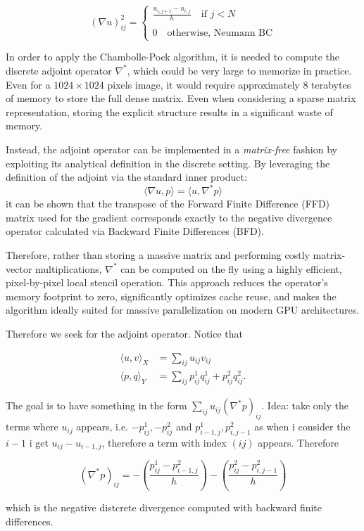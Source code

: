 \begin{example}
    \[ (\nabla u)_{ij}^2 = \begin{cases}
        \displaystyle\frac{u_{i,j+1} - u_{i,j}}{h} \quad \text{if } j < N \\
        \\ 
        0 \quad\text{otherwise, Neumann BC}
    \end{cases}
    \]

    In order to apply the Chambolle-Pock algorithm, it is needed to compute the discrete adjoint operator $\nabla^*$, which could be very large to memorize in practice. Even for a $1024 \times 1024$ pixels image, it would require approximately 8 terabytes of memory to store the full dense matrix. Even when considering a sparse matrix representation, storing the explicit structure results in a significant waste of memory. 

    Instead, the adjoint operator can be implemented in a \textit{matrix-free} fashion by exploiting its analytical definition in the discrete setting. By leveraging the definition of the adjoint via the standard inner product:
    \begin{equation}
    \langle \nabla u, p \rangle = \langle u, \nabla^* p \rangle
    \end{equation}
    it can be shown that the transpose of the Forward Finite Difference (FFD) matrix used for the gradient corresponds exactly to the negative divergence operator calculated via Backward Finite Differences (BFD). 

    Therefore, rather than storing a massive matrix and performing costly matrix-vector multiplications, $\nabla^*$ can be computed on the fly using a highly efficient, pixel-by-pixel local stencil operation. This approach reduces the operator's memory footprint to zero, significantly optimizes cache reuse, and makes the algorithm ideally suited for massive parallelization on modern GPU architectures.

    Therefore we seek for the adjoint operator. Notice that 

    \begin{align*}
        \langle u,v \rangle_X &= \sum_{ij} u_{ij}v_{ij} \\
        \langle p,q \rangle_Y &= \sum_{ij} p_{ij}^1 q_{ij}^1 + p_{ij}^2 q_{ij}^2.
    \end{align*}

    The goal is to have something in the form $\sum_{ij} u_{ij} (\nabla^* p)_{ij}$. Idea: take only the terms where $u_{ij}$ appears, i.e. $-p^1_{ij},-p^2_{ij}$ and $p_{i-1,j}^1, p_{i,j-1}^2$ as when i consider the $i-1$ i get $u_{ij} - u_{i-1,j}$, therefore a term with index $(ij)$ appears. Therefore 

    \[ (\nabla^* p)_{ij} = - \left(\frac{p_{ij}^1 - p_{i-1,j}^2}{h}\right) - \left(\frac{p_{ij}^2 - p_{i,j-1}^2}{h}\right) \]

    which is the negative distcrete divergence computed with backward finite differences.

\end{example}